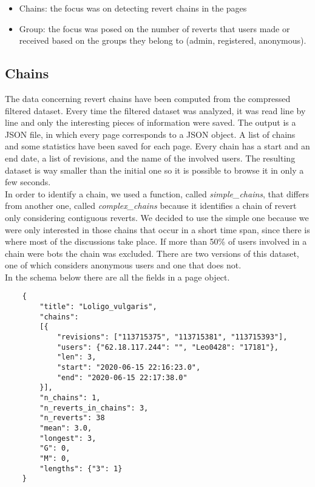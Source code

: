 \begin{itemize}
    \item Chains:  the focus was on detecting revert chains in the pages 
    \item Group:  the focus was posed on the number of reverts that users made or received based on the groups they belong to (admin, registered, anonymous).
\end{itemize}

\subsection{Chains}
The data concerning revert chains have been computed from the compressed filtered dataset. Every
time the filtered dataset was analyzed, it was read line by line and only the interesting
pieces of information were saved. The output is a JSON file, in which every page corresponds to a JSON object.
A list of chains and some statistics have been saved for each page. Every chain has a start and an end date, a
list of revisions, and the name of the involved users. The resulting dataset is way smaller than the initial one so it is
possible to browse it in only a few seconds.\\


In order to identify a chain, we used a function, called \textit{simple\_chains}, that differs from
another one, called \textit{complex\_chains} because it identifies a chain of revert only
considering contiguous reverts. We decided to use the simple one because we were only interested in
those chains that occur in a short time span, since there is where most of the discussions take place.
If more than 50\% of users involved in a chain were bots the chain was excluded. There are two
versions of this dataset, one of which considers anonymous users and one that does not. \\

In the schema below there are all the fields in a page object. 
\begin{verbatim}
    {
        "title": "Loligo_vulgaris", 
        "chains": 
        [{
            "revisions": ["113715375", "113715381", "113715393"], 
            "users": {"62.18.117.244": "", "Leo0428": "17181"}, 
            "len": 3, 
            "start": "2020-06-15 22:16:23.0", 
            "end": "2020-06-15 22:17:38.0"
        }], 
        "n_chains": 1, 
        "n_reverts_in_chains": 3, 
        "n_reverts": 38
        "mean": 3.0, 
        "longest": 3, 
        "G": 0,
        "M": 0, 
        "lengths": {"3": 1}
    }
    
\end{verbatim}


